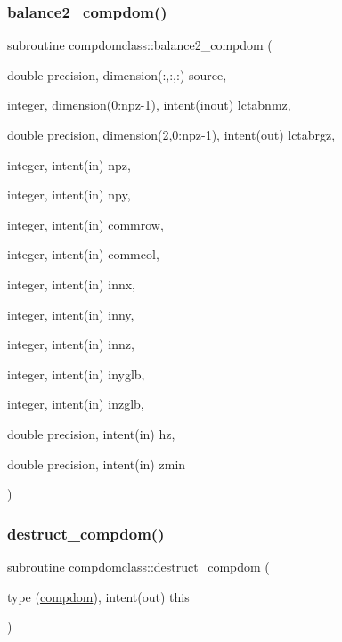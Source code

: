 \subsubsection{\texorpdfstring{balance2\_compdom()}{balance2\_compdom()}}
{\footnotesize\ttfamily subroutine compdomclass\+::balance2\+\_\+compdom (\begin{DoxyParamCaption}\item[{double precision, dimension(\+:,\+:,\+:)}]{source,  }\item[{integer, dimension(0\+:npz-\/1), intent(inout)}]{lctabnmz,  }\item[{double precision, dimension(2,0\+:npz-\/1), intent(out)}]{lctabrgz,  }\item[{integer, intent(in)}]{npz,  }\item[{integer, intent(in)}]{npy,  }\item[{integer, intent(in)}]{commrow,  }\item[{integer, intent(in)}]{commcol,  }\item[{integer, intent(in)}]{innx,  }\item[{integer, intent(in)}]{inny,  }\item[{integer, intent(in)}]{innz,  }\item[{integer, intent(in)}]{inyglb,  }\item[{integer, intent(in)}]{inzglb,  }\item[{double precision, intent(in)}]{hz,  }\item[{double precision, intent(in)}]{zmin }\end{DoxyParamCaption})}

\mbox{\label{namespacecompdomclass_ae220a1544909bd8851faed61ce9ad7b8}} 
\subsubsection{\texorpdfstring{destruct\_compdom()}{destruct\_compdom()}}
{\footnotesize\ttfamily subroutine compdomclass\+::destruct\+\_\+compdom (\begin{DoxyParamCaption}\item[{type (\mbox{\hyperlink{namespacecompdomclass_structcompdomclass_1_1compdom}{compdom}}), intent(out)}]{this }\end{DoxyParamCaption})}

